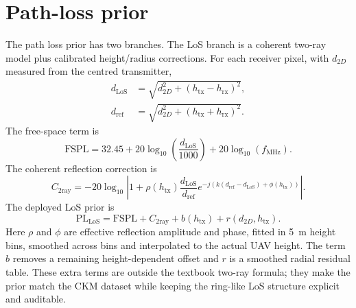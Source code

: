 \section{Path-loss prior}
\label{sec:try78_detail}

The path loss prior has two branches.
The LoS branch is a coherent two-ray model plus calibrated height/radius
corrections. For each receiver pixel, with \(d_{2D}\) measured from the centred
transmitter,
\begin{equation}
\begin{aligned}
d_{\mathrm{LoS}}&=\sqrt{d_{2D}^2+(h_{\mathrm{tx}}-h_{\mathrm{rx}})^2},\\
d_{\mathrm{ref}}&=\sqrt{d_{2D}^2+(h_{\mathrm{tx}}+h_{\mathrm{rx}})^2}.
\end{aligned}
\label{eq:d_los_ref_compact}
\end{equation}
The free-space term is
\begin{equation}
\mathrm{FSPL}
=32.45+20\log_{10}\!\left(\frac{d_{\mathrm{LoS}}}{1000}\right)
+20\log_{10}(f_{\mathrm{MHz}}).
\label{eq:fspl}
\end{equation}
The coherent reflection correction is
\begin{equation}
C_{\mathrm{2ray}}
=-20\log_{10}\!\left|
1+\rho(h_{\mathrm{tx}})\frac{d_{\mathrm{LoS}}}{d_{\mathrm{ref}}}
e^{-j(k(d_{\mathrm{ref}}-d_{\mathrm{LoS}})+\phi(h_{\mathrm{tx}}))}
\right|.
\label{eq:c2ray}
\end{equation}
The deployed LoS prior is
\begin{equation}
\mathrm{PL}_{\mathrm{LoS}}
=\mathrm{FSPL}+C_{\mathrm{2ray}}+b(h_{\mathrm{tx}})
+r(d_{2D},h_{\mathrm{tx}}).
\label{eq:pl_los}
\end{equation}
Here \(\rho\) and \(\phi\) are effective reflection amplitude and phase,
fitted in \SI{5}{m} height bins, smoothed across bins and interpolated to the
actual UAV height. The term \(b\) removes a remaining height-dependent offset
and \(r\) is a smoothed radial residual table. These extra terms are outside
the textbook two-ray formula; they make the prior match the CKM dataset while
keeping the ring-like LoS structure explicit and auditable.

